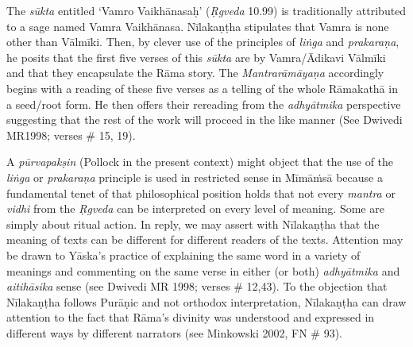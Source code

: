 The \textit{sūkta} entitled ‘Vamro Vaikhānasaḥ’ (\textit{Ṛgveda} 10.99) is traditionally attributed to a sage named Vamra Vaikhānasa. Nīlakaṇṭha stipulates that Vamra is none other than Vālmīki. Then, by clever use of the principles of \textit{liṅga} and \textit{prakaraṇa}, he posits that the first five verses of this \textit{sūkta} are by Vamra/Ādikavi Vālmīki and that they encapsulate the Rāma story. The \textit{Mantrarāmāyaṇa} accordingly begins with a reading of these five verses as a telling of the whole Rāmakathā in a seed/root form. He then offers their rereading from the \textit{adhyātmika} perspective suggesting that the rest of the work will proceed in the like manner (See Dwivedi MR1998; verses \# 15, 19).

A \textit{pūrvapakṣin} (Pollock in the present context) might object that the use of the \textit{liṅga} or \textit{prakaraṇa} principle is used in restricted sense in Mīmāṁsā because a fundamental tenet of that philosophical position holds that not every \textit{mantra} or \textit{vidhi} from the \textit{Ṛgveda} can be interpreted on every level of meaning. Some are simply about ritual action. In reply, we may assert with Nīlakaṇṭha that the meaning of texts can be different for different readers of the texts. Attention may be drawn to Yāska's practice of explaining the same word in a variety of meanings and commenting on the same verse in either (or both) \textit{adhyātmika} and \textit{aitihāsika} sense (see Dwivedi MR 1998; verses \# 12,43). To the objection that Nīlakaṇṭha follows Purāṇic and not orthodox interpretation, Nīlakaṇṭha can draw attention to the fact that Rāma's divinity was understood and expressed in different ways by different narrators (see Minkowski 2002, FN \# 93).

